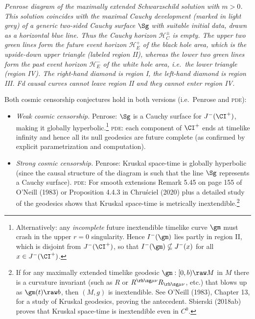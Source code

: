 \documentclass[11pt,a4paper]{article}
\newcommand{\pde}{\textsc{pde}}
\begin{document}
\emph{Penrose diagram of the maximally extended Schwarzschild solution with $m>0$. This solution coincides with the maximal Cauchy development (marked in light grey) of a generic two-sided Cauchy surface $\Sg$ with suitable initial data, drawn as a horizontal blue line.  Thus the Cauchy horizon $\mathcal{H}^{\pm}_C$ is empty. The upper two green lines form the future event horizon $\mathcal{H}^+_E$ of the black hole area, which is the upside-down upper triangle (labeled region II), whereas the lower two green lines form the past event horizon $\mathcal{H}^-_E$ of the white hole area, i.e.\ the  lower triangle (region IV). The right-hand diamond is region I, the left-hand diamond is region III.
Fd causal curves cannot \emph{leave} region II and they cannot 
\emph{enter} region IV.
}\smallskip

 Both cosmic censorship conjectures hold in both versions (i.e.\ Penrose and \pde):
\begin{itemize}
\item  \emph{Weak  cosmic censorship.} Penrose:  $\Sg$ is a Cauchy surface for $J^-(\CI^+)$, making it globally hyperbolic.\footnote{Alternatively: any \emph{incomplete} future inextendible timelike curve $\gm$  must crash in the upper $r=0$ singularity. Hence $I^-(\gm)$ lies partly in region II, which is disjoint from $J^-(\CI^+)$, so that $I^-(\gm)\nsubseteq J^-(x)$  for all $x\in J^-(\CI^+)$.} \pde: each component of $\CI^+$ ends  at timelike infinity and hence all its null geodesics are future complete (as confirmed by explicit parametrization and computation). 
\item \emph{Strong  cosmic censorship.}   Penrose: Kruskal space-time is globally hyperbolic (since the causal structure
of the diagram  is such that the line $\Sg$ represents a Cauchy surface).
 \pde: For smooth extensions
 Remark 5.45 on page 155 of O'Neill (1983) or Proposition 4.4.3 in  Chru\'{s}ciel (2020) plus a detailed study of the geodesics shows that  Kruskal space-time is metrically
 inextendible.\footnote{ If for any maximally extended timelike geodesic $\gm:[0,b)\raw M$ in $M$ there is a curvature invariant (such as $R$ or $R^{\rh\sg\mu\nu}R_{\rh\sg\mu\nu}$, etc.)
  that blows up as $\gm(t)\raw b$, then $(M,g)$ is  inextendible. 
 See O'Neill (1983), Chapter 13, for a study of Kruskal geodesics,  proving the antecedent.
Sbierski (2018ab) proves that Kruskal space-time is inextendible even in $C^0$.}
\end{itemize}
\end{document}
